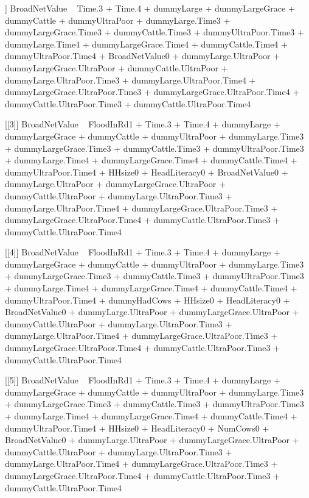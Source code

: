 \begin{Schunk}
\begin{Soutput}
[[2]]
BroadNetValue ~ Time.3 + Time.4 + dummyLarge + dummyLargeGrace + 
    dummyCattle + dummyUltraPoor + dummyLarge.Time3 + dummyLargeGrace.Time3 + 
    dummyCattle.Time3 + dummyUltraPoor.Time3 + dummyLarge.Time4 + 
    dummyLargeGrace.Time4 + dummyCattle.Time4 + dummyUltraPoor.Time4 + 
    BroadNetValue0 + dummyLarge.UltraPoor + dummyLargeGrace.UltraPoor + 
    dummyCattle.UltraPoor + dummyLarge.UltraPoor.Time3 + dummyLarge.UltraPoor.Time4 + 
    dummyLargeGrace.UltraPoor.Time3 + dummyLargeGrace.UltraPoor.Time4 + 
    dummyCattle.UltraPoor.Time3 + dummyCattle.UltraPoor.Time4

[[3]]
BroadNetValue ~ FloodInRd1 + Time.3 + Time.4 + dummyLarge + dummyLargeGrace + 
    dummyCattle + dummyUltraPoor + dummyLarge.Time3 + dummyLargeGrace.Time3 + 
    dummyCattle.Time3 + dummyUltraPoor.Time3 + dummyLarge.Time4 + 
    dummyLargeGrace.Time4 + dummyCattle.Time4 + dummyUltraPoor.Time4 + 
    HHsize0 + HeadLiteracy0 + BroadNetValue0 + dummyLarge.UltraPoor + 
    dummyLargeGrace.UltraPoor + dummyCattle.UltraPoor + dummyLarge.UltraPoor.Time3 + 
    dummyLarge.UltraPoor.Time4 + dummyLargeGrace.UltraPoor.Time3 + 
    dummyLargeGrace.UltraPoor.Time4 + dummyCattle.UltraPoor.Time3 + 
    dummyCattle.UltraPoor.Time4

[[4]]
BroadNetValue ~ FloodInRd1 + Time.3 + Time.4 + dummyLarge + dummyLargeGrace + 
    dummyCattle + dummyUltraPoor + dummyLarge.Time3 + dummyLargeGrace.Time3 + 
    dummyCattle.Time3 + dummyUltraPoor.Time3 + dummyLarge.Time4 + 
    dummyLargeGrace.Time4 + dummyCattle.Time4 + dummyUltraPoor.Time4 + 
    dummyHadCows + HHsize0 + HeadLiteracy0 + BroadNetValue0 + 
    dummyLarge.UltraPoor + dummyLargeGrace.UltraPoor + dummyCattle.UltraPoor + 
    dummyLarge.UltraPoor.Time3 + dummyLarge.UltraPoor.Time4 + 
    dummyLargeGrace.UltraPoor.Time3 + dummyLargeGrace.UltraPoor.Time4 + 
    dummyCattle.UltraPoor.Time3 + dummyCattle.UltraPoor.Time4

[[5]]
BroadNetValue ~ FloodInRd1 + Time.3 + Time.4 + dummyLarge + dummyLargeGrace + 
    dummyCattle + dummyUltraPoor + dummyLarge.Time3 + dummyLargeGrace.Time3 + 
    dummyCattle.Time3 + dummyUltraPoor.Time3 + dummyLarge.Time4 + 
    dummyLargeGrace.Time4 + dummyCattle.Time4 + dummyUltraPoor.Time4 + 
    HHsize0 + HeadLiteracy0 + NumCows0 + BroadNetValue0 + dummyLarge.UltraPoor + 
    dummyLargeGrace.UltraPoor + dummyCattle.UltraPoor + dummyLarge.UltraPoor.Time3 + 
    dummyLarge.UltraPoor.Time4 + dummyLargeGrace.UltraPoor.Time3 + 
    dummyLargeGrace.UltraPoor.Time4 + dummyCattle.UltraPoor.Time3 + 
    dummyCattle.UltraPoor.Time4


\end{Soutput}
\end{Schunk}
